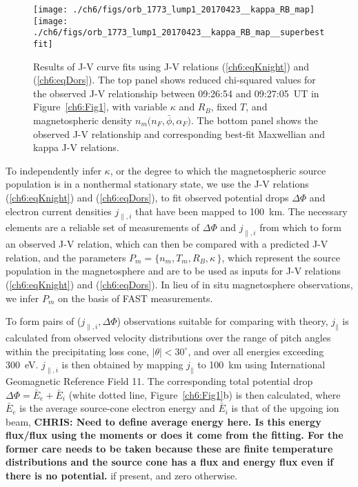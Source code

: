 
  \begin{figure}
    \centering
    \noindent\texttt{[image: ./ch6/figs/orb\_1773\_lump1\_20170423\_\_kappa\_RB\_map]}
    \noindent\texttt{[image: ./ch6/figs/orb\_1773\_lump1\_20170423\_\_kappa\_RB\_map\_\_superbestfit]}
    \caption[Orbit 1773: Reduced chi-squared values for observed J-V curves with
    variable $\kappa$ and $R_B$, fixed $T$, and magnetospheric density $n_m \big
    ( n_F, \bar{\phi}, \alpha_F \big )$, and corresponding best-fit J-V
    curves.]{Results of J-V curve fits using J-V relations (\ref{ch6:eqKnight})
      and (\ref{ch6:eqDors}). The top panel shows reduced chi-squared values for
      the observed J-V relationship between 09:26:54 and 09:27:05~UT in
      Figure~\ref{ch6:Fig1}, with variable $\kappa$ and $R_B$, fixed $T$, and
      magnetospheric density $n_m \big ( n_F, \bar{\phi}, \alpha_F \big )$. The
      bottom panel shows the observed J-V relationship and corresponding
      best-fit Maxwellian and kappa J-V relations.}
    \label{ch6:Fig3}
  \end{figure}


  To independently infer $\kappa$, or the degree to which the magnetospheric
  source population is in a nonthermal stationary state, we use the J-V
  relations (\ref{ch6:eqKnight}) and (\ref{ch6:eqDors}), to fit observed
  potential drops $\Delta \Phi$ and electron current densities $j_{\parallel,i}$
  that have been mapped to 100~km. The necessary elements are a reliable set of
  measurements of $\Delta \Phi$ and $j_{\parallel,i}$ from which to form an
  observed J-V relation, which can then be compared with a predicted J-V
  relation, and the parameters $P_m = \{ n_m, T_m, R_B, \kappa \, \}$, which
  represent the source population in the magnetosphere and are to be used as
  inputs for J-V relations (\ref{ch6:eqKnight}) and (\ref{ch6:eqDors}). In lieu
  of in situ magnetosphere observations, we infer $P_m$ on the basis of FAST
  measurements.

  To form pairs of ($j_{\parallel,i}, \Delta \Phi$) observations suitable for
  comparing with theory, $j_\parallel$ is calculated from observed velocity
  distributions over the range of pitch angles within the precipitating loss
  cone, $\vert \theta \vert < 30^\circ$, and over all energies exceeding 300~eV.
  $j_{\parallel,i}$ is then obtained by mapping $j_\parallel$ to 100~km using
  International Geomagnetic Reference Field 11. The corresponding total
  potential drop $\Delta \Phi = \bar{E}_e + \bar{E}_i$ (white dotted line,
  Figure~\ref{ch6:Fig1}b) is then calculated, where $\bar{E}_e$ is the average
  source-cone electron energy and $\bar{E}_i$ is that of the upgoing ion beam,
  \textbf{CHRIS: Need to define average energy here. Is this energy flux/flux
    using the moments or does it come from the fitting. For the former care
    needs to be taken because these are finite temperature distributions and the
    source cone has a flux and energy flux even if there is no potential. }if
  present, and zero otherwise.

